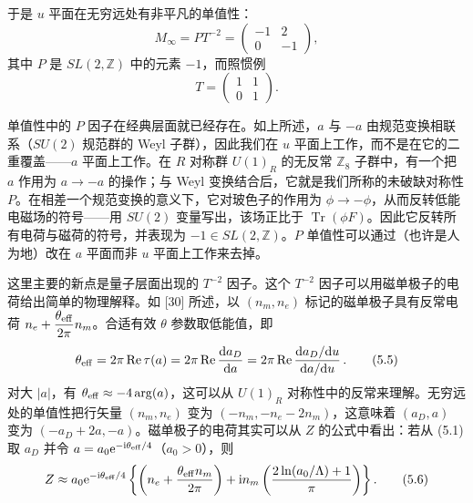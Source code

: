 \documentclass[11pt,a4paper,UTF8,fontset=fandol]{ctexart}
\theoremstyle{plain}
\theoremstyle{definition}
\newcommand{\Z}{\mathbb{Z}}
\newcommand{\dd}{\mathrm{d}}
\newcommand{\ee}{\mathrm{e}}
\newcommand{\ii}{\mathrm{i}}
\newcommand{\Tr}{\operatorname{Tr}}
\renewcommand{\Re}{\operatorname{Re}}
\begin{document}
于是 $u$ 平面在无穷远处有非平凡的单值性：
\begin{equation}
  M_\infty=PT^{-2}=\begin{pmatrix}-1&2\\0&-1\end{pmatrix}, \tag{5.3}
\end{equation}
其中 $P$ 是 $SL(2,\Z)$ 中的元素 $-1$，而照惯例
\begin{equation}
  T=\begin{pmatrix}1&1\\0&1\end{pmatrix}. \tag{5.4}
\end{equation}

单值性中的 $P$ 因子在经典层面就已经存在。如上所述，$a$ 与 $-a$ 由规范变换相联系（$SU(2)$ 规范群的 Weyl 子群），因此我们在 $u$ 平面上工作，而不是在它的二重覆盖——$a$ 平面上工作。在 $R$ 对称群 $U(1)_R$ 的无反常 $\Z_8$ 子群中，有一个把 $a$ 作用为 $a\to-a$ 的操作；与 Weyl 变换结合后，它就是我们所称的未破缺对称性 $P$。在相差一个规范变换的意义下，它对玻色子的作用为 $\phi\to-\phi$，从而反转低能电磁场的符号——用 $SU(2)$ 变量写出，该场正比于 $\Tr(\phi F)$。因此它反转所有电荷与磁荷的符号，并表现为 $-1\in SL(2,\Z)$。$P$ 单值性可以通过（也许是人为地）改在 $a$ 平面而非 $u$ 平面上工作来去掉。

这里主要的新点是量子层面出现的 $T^{-2}$ 因子。这个 $T^{-2}$ 因子可以用磁单极子的电荷给出简单的物理解释。如 [30] 所述，以 $(n_m,n_e)$ 标记的磁单极子具有反常电荷 $n_e+\dfrac{\theta_{\rm eff}}{2\pi}n_m$。合适有效 $\theta$ 参数取低能值，即
\begin{equation}
  \theta_{\rm eff}=2\pi\Re\tau(a)=2\pi\Re\frac{\dd a_D}{\dd a}=2\pi\Re\frac{\dd a_D/\dd u}{\dd a/\dd u}\,. \tag{5.5}
\end{equation}
对大 $|a|$，有 $\theta_{\rm eff}\approx-4\arg(a)$，这可以从 $U(1)_R$ 对称性中的反常来理解。无穷远处的单值性把行矢量 $(n_m,n_e)$ 变为 $(-n_m,-n_e-2n_m)$，这意味着 $(a_D,a)$ 变为 $(-a_D+2a,-a)$。磁单极子的电荷其实可以从 $Z$ 的公式中看出：若从 (5.1) 取 $a_D$ 并令 $a=a_0\ee^{-\ii\theta_{\rm eff}/4}$（$a_0>0$），则
\begin{equation}
  Z\approx a_0\ee^{-\ii\theta_{\rm eff}/4}\left\{\left(n_e+\frac{\theta_{\rm eff}n_m}{2\pi}\right)+\ii n_m\left(\frac{2\ln(a_0/\Lambda)+1}{\pi}\right)\right\}. \tag{5.6}
\end{equation}
\end{document}
